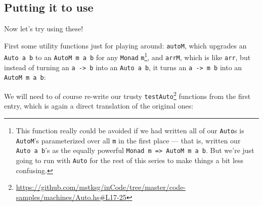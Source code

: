 \documentclass[]{article}
\newenvironment{Shaded}{}{}
\newcommand{\KeywordTok}[1]{\textcolor[rgb]{0.00,0.44,0.13}{\textbf{{#1}}}}
\newcommand{\DataTypeTok}[1]{\textcolor[rgb]{0.56,0.13,0.00}{{#1}}}
\newcommand{\CommentTok}[1]{\textcolor[rgb]{0.38,0.63,0.69}{\textit{{#1}}}}
\newcommand{\OtherTok}[1]{\textcolor[rgb]{0.00,0.44,0.13}{{#1}}}
\newcommand{\FunctionTok}[1]{\textcolor[rgb]{0.02,0.16,0.49}{{#1}}}
\newcommand{\NormalTok}[1]{{#1}}
\renewcommand{\href}[2]{#2\footnote{\url{#1}}}
\begin{document}
\subsection{Putting it to use}\label{putting-it-to-use}

Now let's try using these!

First some utility functions just for playing around: \texttt{autoM},
which upgrades an \texttt{Auto\ a\ b} to an \texttt{AutoM\ m\ a\ b} for
any \texttt{Monad} \texttt{m}\footnote{This function really could be
  avoided if we had written all of our \texttt{Auto}s is
  \texttt{AutoM}'s parameterized over all \texttt{m} in the first place
  --- that is, written our \texttt{Auto\ a\ b}'s as the equally powerful
  \texttt{Monad\ m\ =\textgreater{}\ AutoM\ m\ a\ b}. But we're just
  going to run with \texttt{Auto} for the rest of this series to make
  things a bit less confusing.}, and \texttt{arrM}, which is like
\texttt{arr}, but instead of turning an \texttt{a\ -\textgreater{}\ b}
into an \texttt{Auto\ a\ b}, it turns an
\texttt{a\ -\textgreater{}\ m\ b} into an \texttt{AutoM\ m\ a\ b}:

\begin{Shaded}
\end{Shaded}

We will need to of course re-write our trusty
\href{https://github.com/mstksg/inCode/tree/master/code-samples/machines/Auto.hs\#L17-25}{\texttt{testAuto}}
functions from the first entry, which is again a direct translation of
the original ones:
\end{document}
